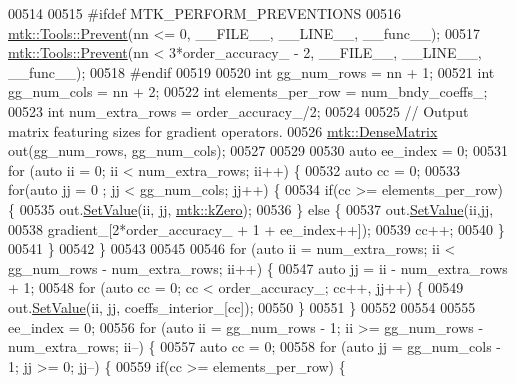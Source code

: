\begin{DoxyCode}
{{00514 
00515 \textcolor{preprocessor}{  #ifdef MTK\_PERFORM\_PREVENTIONS}
00516   \hyperlink{classmtk_1_1Tools_a332324c6f25e66be9dff48c5987a3b9f}{mtk::Tools::Prevent}(nn <= 0, \_\_FILE\_\_, \_\_LINE\_\_, \_\_func\_\_);
00517   \hyperlink{classmtk_1_1Tools_a332324c6f25e66be9dff48c5987a3b9f}{mtk::Tools::Prevent}(nn < 3*order\_accuracy\_ - 2, \_\_FILE\_\_, \_\_LINE\_\_, \_\_func\_\_);
00518 \textcolor{preprocessor}{  #endif}
00519 
00520   \textcolor{keywordtype}{int} gg\_num\_rows = nn + 1;
00521   \textcolor{keywordtype}{int} gg\_num\_cols = nn + 2;
00522   \textcolor{keywordtype}{int} elements\_per\_row = num\_bndy\_coeffs\_;
00523   \textcolor{keywordtype}{int} num\_extra\_rows = order\_accuracy\_/2;
00524 
00525   \textcolor{comment}{// Output matrix featuring sizes for gradient operators.}
00526   \hyperlink{classmtk_1_1DenseMatrix}{mtk::DenseMatrix} out(gg\_num\_rows, gg\_num\_cols);
00527 
00529 
00530   \textcolor{keyword}{auto} ee\_index = 0;
00531   \textcolor{keywordflow}{for} (\textcolor{keyword}{auto} ii = 0; ii < num\_extra\_rows; ii++) \{
00532     \textcolor{keyword}{auto} cc = 0;
00533     \textcolor{keywordflow}{for}(\textcolor{keyword}{auto} jj = 0 ; jj < gg\_num\_cols; jj++) \{
00534       \textcolor{keywordflow}{if}(cc >= elements\_per\_row) \{
00535         out.\hyperlink{classmtk_1_1DenseMatrix_a784ce5784109ac86bfb9d8562b334b13}{SetValue}(ii, jj, \hyperlink{group__c01-roots_ga59a451a5fae30d59649bcda274fea271}{mtk::kZero});
00536       \} \textcolor{keywordflow}{else} \{
00537         out.\hyperlink{classmtk_1_1DenseMatrix_a784ce5784109ac86bfb9d8562b334b13}{SetValue}(ii,jj,
00538                      gradient\_[2*order\_accuracy\_ + 1 + ee\_index++]);
00539         cc++;
00540       \}
00541     \}
00542   \}
00543 
00545 
00546   \textcolor{keywordflow}{for} (\textcolor{keyword}{auto} ii = num\_extra\_rows; ii < gg\_num\_rows - num\_extra\_rows; ii++) \{
00547     \textcolor{keyword}{auto} jj = ii - num\_extra\_rows + 1;
00548     \textcolor{keywordflow}{for} (\textcolor{keyword}{auto} cc = 0; cc < order\_accuracy\_; cc++, jj++) \{
00549       out.\hyperlink{classmtk_1_1DenseMatrix_a784ce5784109ac86bfb9d8562b334b13}{SetValue}(ii, jj, coeffs\_interior\_[cc]);
00550     \}
00551   \}
00552 
00554 
00555   ee\_index = 0;
00556   \textcolor{keywordflow}{for} (\textcolor{keyword}{auto} ii = gg\_num\_rows - 1; ii >= gg\_num\_rows - num\_extra\_rows; ii--) \{
00557     \textcolor{keyword}{auto} cc = 0;
00558     \textcolor{keywordflow}{for} (\textcolor{keyword}{auto} jj = gg\_num\_cols - 1; jj >= 0; jj--) \{
00559       \textcolor{keywordflow}{if}(cc >= elements\_per\_row) \{
}}
\end{DoxyCode}
